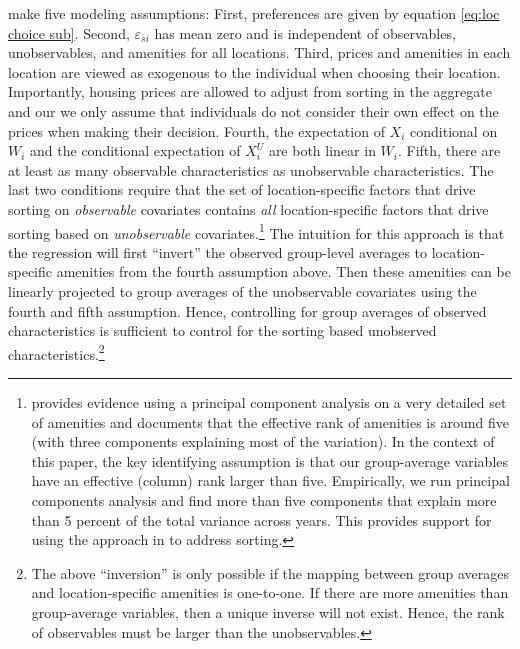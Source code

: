 \documentclass[12pt]{article}
\begin{document}
\citet{altonji2018estimating} make five modeling assumptions: First, preferences are given by equation \eqref{eq:loc choice sub}.
Second, $\varepsilon_{si}$ has mean zero and is independent of observables, unobservables, and amenities for all locations.
Third, prices and amenities in each location are viewed as exogenous to the individual when choosing their location.
Importantly, housing prices are allowed to adjust from sorting in the aggregate and our we only assume that individuals do not consider their own effect on the prices when making their decision.
Fourth, the expectation of ${X}_i$ conditional on ${W}_i$ and the conditional expectation of ${X}_i^U$ are both linear in ${W}_i$.  
Fifth, there are at least as many observable characteristics as unobservable characteristics.
The last two conditions require that the set of location-specific factors that drive sorting on \emph{observable} covariates contains \emph{all} location-specific factors that drive sorting based on \emph{unobservable} covariates.\footnote{
  \citet{Diamond_2016} provides evidence using a principal component analysis on a very detailed set of amenities and documents that the effective rank of amenities is around five (with three components explaining most of the variation).
  In the context of this paper, the key identifying assumption is that our group-average variables have an effective (column) rank larger than five.
  Empirically, we run principal components analysis and find more than five components that explain more than 5 percent of the total variance across years.
  This provides support for using the approach in \citet{altonji2018estimating} to address sorting.
} 
The intuition for this approach is that the regression will first ``invert'' the observed group-level averages to location-specific amenities from the fourth assumption above.
Then these amenities can be linearly projected to group averages of the unobservable covariates using the fourth and fifth assumption.
Hence, controlling for group averages of observed characteristics is sufficient to control for the sorting based unobserved characteristics.\footnote{
  The above ``inversion'' is only possible if the mapping between group averages and location-specific amenities is one-to-one.
  If there are more amenities than group-average variables, then a unique inverse will not exist.
  Hence, the rank of observables must be larger than the unobservables.
}
\end{document}
